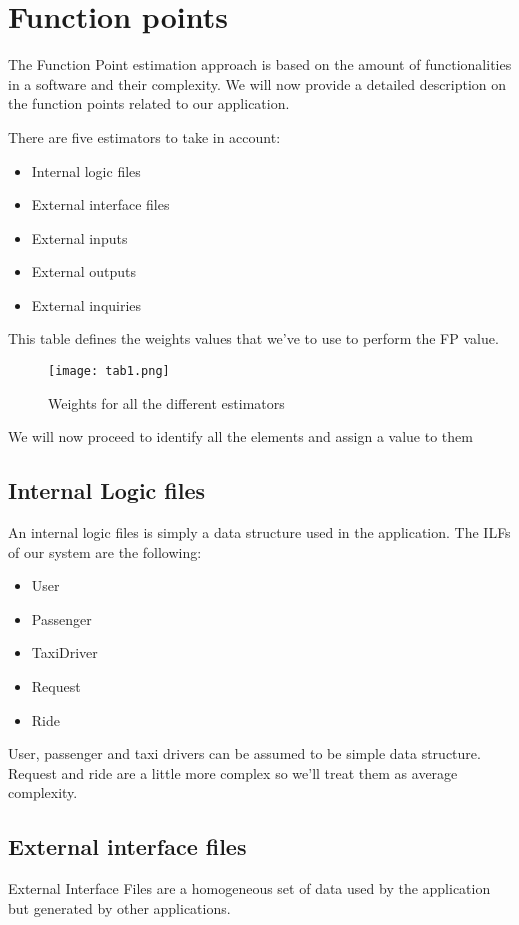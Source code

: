 \section{Function points}
The Function Point estimation approach is based on the amount of functionalities in a software and their complexity.
We will now provide a detailed description on the function points related to our application.

There are five estimators to take in account:
\begin{itemize}
	\item Internal logic files
	\item External interface files
	\item External inputs
	\item External outputs
	\item External inquiries
\end{itemize}

This table defines the weights values that we've to use to perform the FP value.
\begin{figure}[h]
	\centering
	\texttt{[image: tab1.png]}
	\caption{Weights for all the different estimators}
\end{figure}

We will now proceed to identify all the elements and assign a value to them

\subsection{Internal Logic files}
An internal logic files is simply a data structure used in the application.
The ILFs of our system are the following:
\begin{itemize}
	\item User
	\item Passenger
	\item TaxiDriver
	\item Request
	\item Ride
\end{itemize}
User, passenger and taxi drivers can be assumed to be simple data structure. Request and ride are a little more complex so we'll treat them as average complexity.

\subsection{External interface files}
External Interface Files are a homogeneous set of data used by the application but generated by other applications.

